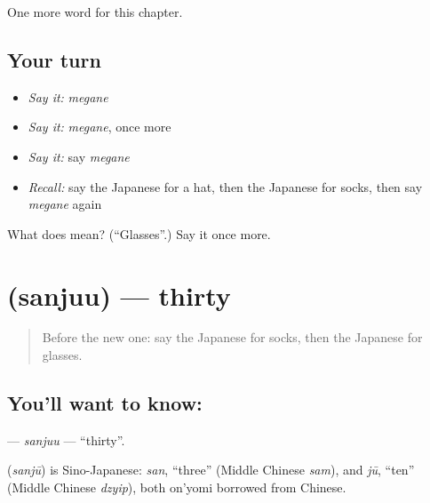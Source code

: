 \begin{grammarlens}[title={What you've built}]
One more word for this chapter.
\end{grammarlens}

\subsection*{Your turn}
\begin{itemize}
\raggedright
  \item \emph{Say it:} \emph{megane}
  \item \emph{Say it:} \emph{megane}, once more
  \item \emph{Say it:} say \emph{megane}
  \item \emph{Recall:} say the Japanese for a hat, then the Japanese for socks, then say \emph{megane} again
\end{itemize}

\begin{tcolorbox}[breakable,colback=teal!4,colframe=teal!35!black,title={Before you move on}]
What does  mean? (\textquotedblleft{}Glasses\textquotedblright{}.) Say it once more.
\end{tcolorbox}
\section[\texorpdfstring{\ja{さんじゅう} (sanjuu)}{さんじゅう (sanjuu)}]{ (sanjuu) — thirty}

\label{lesson:JA-C59-sanjuu}



\begin{quote}
Before the new one: say the Japanese for socks, then the Japanese for glasses.
\end{quote}

\subsection*{You'll want to know: }
\textbf{} — \emph{sanjuu} — \textquotedblleft{}thirty\textquotedblright{}.

\begin{cousinweb}
\textbf{} (\emph{sanjū}) is Sino-Japanese: \emph{san}, \textquotedblleft{}three\textquotedblright{} (Middle Chinese \emph{sam}), and \emph{jū}, \textquotedblleft{}ten\textquotedblright{} (Middle Chinese \emph{dzyip}), both on'yomi borrowed from Chinese.
\end{cousinweb}

